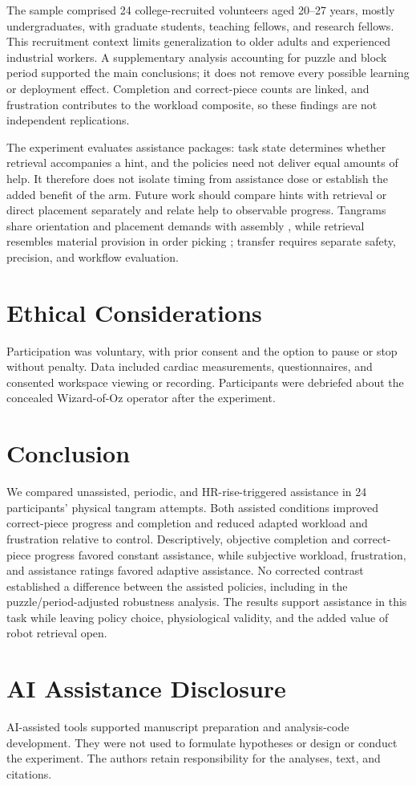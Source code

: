 \documentclass[sigconf,anonymous]{aamas}
\begin{document}
The sample comprised 24 college-recruited volunteers aged 20--27 years, mostly undergraduates, with graduate students, teaching fellows, and research fellows. This recruitment context limits generalization to older adults and experienced industrial workers. A supplementary analysis accounting for puzzle and block period supported the main conclusions; it does not remove every possible learning or deployment effect. Completion and correct-piece counts are linked, and frustration contributes to the workload composite, so these findings are not independent replications.

The experiment evaluates assistance packages: task state determines whether retrieval accompanies a hint, and the policies need not deliver equal amounts of help. It therefore does not isolate timing from assistance dose or establish the added benefit of the arm. Future work should compare hints with retrieval or direct placement separately and relate help to observable progress. Tangrams share orientation and placement demands with assembly \cite{zhao2025}, while retrieval resembles material provision in order picking \cite{smit2024}; transfer requires separate safety, precision, and workflow evaluation.

\section{Ethical Considerations}

Participation was voluntary, with prior consent and the option to pause or stop without penalty. Data included cardiac measurements, questionnaires, and consented workspace viewing or recording. Participants were debriefed about the concealed Wizard-of-Oz operator after the experiment.

\section{Conclusion}

We compared unassisted, periodic, and HR-rise-triggered assistance in 24 participants' physical tangram attempts. Both assisted conditions improved correct-piece progress and completion and reduced adapted workload and frustration relative to control. Descriptively, objective completion and correct-piece progress favored constant assistance, while subjective workload, frustration, and assistance ratings favored adaptive assistance. No corrected contrast established a difference between the assisted policies, including in the puzzle/period-adjusted robustness analysis. The results support assistance in this task while leaving policy choice, physiological validity, and the added value of robot retrieval open.

\section*{AI Assistance Disclosure}

AI-assisted tools supported manuscript preparation and analysis-code development. They were not used to formulate hypotheses or design or conduct the experiment. The authors retain responsibility for the analyses, text, and citations.



\end{document}
